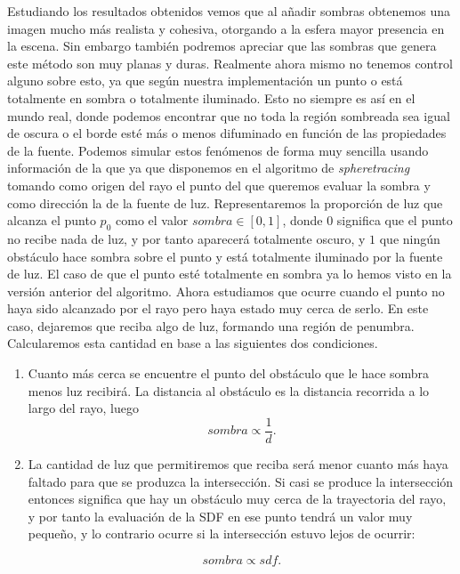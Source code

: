 Estudiando los resultados obtenidos vemos que al añadir sombras obtenemos una imagen mucho más realista y cohesiva, otorgando a la esfera mayor presencia en la escena. Sin embargo también podremos apreciar que las sombras que genera este método son muy planas y duras. Realmente ahora mismo no tenemos control alguno sobre esto, ya que según nuestra implementación un punto o está totalmente en sombra o totalmente iluminado. Esto no siempre es así en el mundo real, donde podemos encontrar que no toda la región sombreada sea igual de oscura o el borde esté más o menos difuminado en función de las propiedades de la fuente. Podemos simular estos fenómenos de forma muy sencilla usando información de la que ya que disponemos en el algoritmo de \textit{spheretracing} tomando como origen del rayo el punto del que queremos evaluar la sombra y como dirección la de la fuente de luz. Representaremos la proporción de luz que alcanza el punto $p_0$ como el valor $sombra \in [0,1]$, donde $0$ significa que el punto no recibe nada de luz, y por tanto aparecerá totalmente oscuro, y $1$ que ningún obstáculo hace sombra sobre el punto y está totalmente iluminado por la fuente de luz. El caso de que el punto esté totalmente en sombra ya lo hemos visto en la versión anterior del algoritmo. Ahora estudiamos que ocurre cuando el punto no haya sido alcanzado por el rayo pero haya estado muy cerca de serlo. En este caso, dejaremos que reciba algo de luz, formando una región de penumbra. Calcularemos esta cantidad en base a las siguientes dos condiciones.
\begin{enumerate}
    \item Cuanto más cerca se encuentre el punto del obstáculo que le hace sombra menos luz recibirá. La distancia al obstáculo es la distancia recorrida a lo largo del rayo, luego
    \begin{equation*}
        sombra \propto \frac{1}{d}.
    \end{equation*}
    \item La cantidad de luz que permitiremos que reciba será menor cuanto más haya faltado para que se produzca la intersección. Si casi se produce la intersección entonces significa que hay un obstáculo muy cerca de la trayectoria del rayo, y por tanto la evaluación de la SDF en ese punto tendrá un valor muy pequeño, y lo contrario ocurre si la intersección estuvo lejos de ocurrir:
    
    \begin{equation*}
        sombra \propto sdf.
    \end{equation*}
\end{enumerate}

